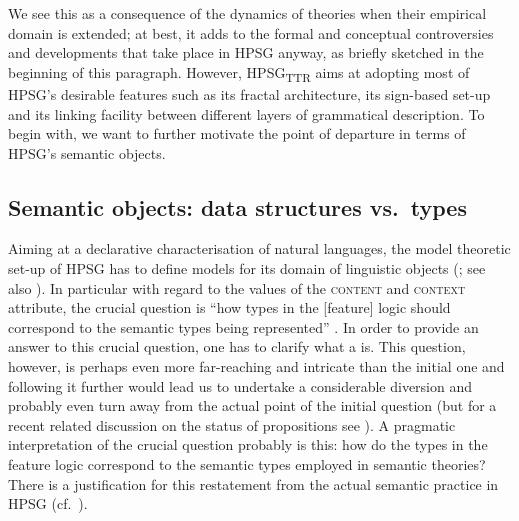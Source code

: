 \documentclass[output=paper
 	        ,biblatex
                ,babelshorthands
                ,newtxmath
                ,draftmode
                ,colorlinks, citecolor=brown
]{langscibook}
\begin{document}
%
We see this as a consequence of the dynamics of theories when their empirical domain is extended; at best, it adds to the formal and conceptual controversies and developments that take place in HPSG anyway, as briefly sketched in the beginning of this paragraph. 
%
However, HPSG\textsubscript{TTR} aims at adopting most of HPSG's desirable features such as its fractal architecture, its sign-based set-up and its linking facility between different layers of grammatical description. 
%
To begin with, we want to further motivate the point of departure in terms of HPSG's semantic objects.


\subsection{Semantic objects: data structures vs.\ types}
\label{sec:semantic-objects}

Aiming at a declarative characterisation of natural languages, the model theoretic set-up of HPSG has to define models for its domain of linguistic objects  (\citealt[Section~3]{Levine:Meurers:2006}; see also ).
%
In particular with regard to the values of the \textsc{content} and \textsc{context} attribute, the crucial question is \enquote{how types in the [feature] logic should correspond to the semantic types being represented}  \citep[]{Penn:2000}.
%
In order to provide an answer to this crucial question, one has to clarify what a  is. 
%
This question, however, is perhaps even more far-reaching and intricate than the initial one and following it further would lead us to undertake a considerable diversion and probably even turn away from the actual point of the initial question (but for a recent related discussion on the status of propositions see \citealt{King:Soames:Speaks:2014}).
%
A pragmatic interpretation of the crucial question probably is this: how do the types in the feature logic correspond to the semantic types employed in semantic theories?
%
There is a justification for this restatement from the actual semantic practice in HPSG (cf.\ ).
\end{document}
